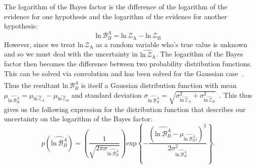 The logarithm of the Bayes factor is the difference of the logarithm of the evidence for one hypothesis and the logarithm of the evidence for another hypothesis:
\begin{equation}\label{eqn:log_bayes_factor}
    \mathrm{ln} \, \mathcal{B}^A_B = \mathrm{ln} \, \mathcal{Z}_{\mathrm{A}} - \mathrm{ln} \, \mathcal{Z}_{\mathrm{B}}
\end{equation}
However, since we treat $\mathrm{ln} \, \mathcal{Z}_{\mathrm{A}}$ as a random variable who's true value is unknown and so we must deal with the uncertainty in $\widehat{\mathrm{ln} \, \mathcal{Z}_{\mathrm{A}}}$. The logarithm of the Bayes factor then becomes the difference between two probability distribution functions. This can be solved via convolution and has been solved for the Gaussian case~\citep{bromiley2003products}. Thus the resultant $\widehat{\mathrm{ln} \, \mathcal{B}^A_B}$ is itself a Gaussian distribution function with mean $\mu_{\widehat{\mathrm{ln} \, \mathcal{B}^A_B}} = \mu_{\widehat{\mathrm{ln} \, \mathcal{Z}_A}} - \mu_{\widehat{\mathrm{ln} \, \mathcal{Z}_B}}$ and standard deviation $\sigma_{\widehat{\mathrm{ln} \, \mathcal{B}^A_B}} = \sqrt{\sigma_{\widehat{\mathrm{ln} \, \mathcal{Z}_A}}^2 + \sigma_{\widehat{\mathrm{ln} \, \mathcal{Z}_B}}^2 }$~\citep{bromiley2003products}. This thus gives us the following expression for the distribution function that describes our uncertainty on the logarithm of the Bayes factor:
\begin{equation}\label{eqn:p_log_b}
    p(\widehat{\mathrm{ln} \, \mathcal{B}^A_B}) = \left(\frac{1}{\sqrt{2 \pi \sigma_{\widehat{\mathrm{ln} \, \mathcal{B}^A_B}}}} \right) \mathrm{exp} \left \{-\frac{\left(\widehat{\mathrm{ln} \, \mathcal{B}^A_B} - \mu_{\widehat{\mathrm{ln} \, \mathcal{B}^A_B})}\right)^2} {2 \sigma^2_{\widehat{\mathrm{ln} \, \mathcal{B}^A_B}}}  \right\}.
\end{equation}

